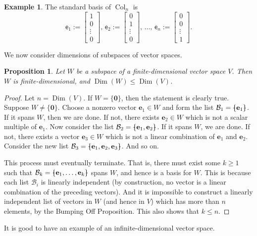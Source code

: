 \documentclass[a4paper,11pt]{book}
\newtheorem{proposition}[theorem]{Proposition}
\theoremstyle{definition}
\newtheorem{example_environment}{Example}[chapter]
\newcommand{\ve}[1]{\mathbf{#1}}
\newcommand{\mat}[1]{\mathsf{#1}}
\newcommand{\col}[1]{\bm{\mat{#1}}}
\newcommand{\basis}[1]{{\mathcal #1}}
\newenvironment{example}
	{
		\begin{oframed} 
		\begin{example_environment}
	}
	{
		\end{example_environment}
		\end{oframed}
	}
\newcommand{\bmark}{\raisebox{.53ex}{\rule{.2em}{.1ex}}}
\newcommand{\bopen}{{\protect\ooalign{\{\cr\hfil\bmark\hfil\cr}}}
\newcommand{\bclose}{{\protect\ooalign{\}\cr\hfil\bmark\hfil\cr}}}
\DeclareMathOperator{\Col}{Col}
\DeclareMathOperator{\Dim}{Dim}
\begin{document}
\begin{example} The standard basis of $\Col_n$ is  
\[
 \col{e}_1 := \left[ \begin{array}{c} 1 \\ 0 \\ \vdots \\ 0 \end{array} \right], \, 
\col{e}_2 := \left[ \begin{array}{c} 0 \\ 1 \\ \vdots \\ 0 \end{array} \right], \, 
\ldots, \,
\col{e}_n := \left[ \begin{array}{c} 0 \\ 0 \\ \vdots \\ 1 \end{array} \right] . 
\]
\end{example}
We now consider dimensions of subspaces of vector spaces. 
\begin{proposition} Let $W$ be a subspace of a finite-dimensional vector space $V$. Then $W$ is finite-dimensional, and $\Dim(W) \leq \Dim(V)$.  \label{dim-of-subspace-prop}
\end{proposition}
\begin{proof} Let $n = \Dim(V)$. If $W = \{ \ve{0} \}$, then the statement is clearly true. Suppose $W \neq \{ \ve{0} \}$. Choose a nonzero vector $\ve{e}_1 \in W$ and form the list $\basis{B}_1 = \bopen \ve{e}_1 \bclose$. If it spans $W$, then we are done. If not, there exists $\ve{e}_2 \in W$ which is not a scalar multiple of $\ve{e}_1$. Now consider the list $\basis{B}_2 = \bopen \ve{e}_1, \ve{e}_2 \bclose$. If it spans $W$, we are done. If not, there exists a vector $\ve{e}_3 \in W$ which is not a linear combination of $\ve{e}_1$ and $\ve{e}_2$. Consider the new list $\basis{B}_3 = \bopen \ve{e}_1, \ve{e}_2, \ve{e}_3 \bclose$. And so on.

This process must eventually terminate. That is, there must exist some $k \geq 1$ such that $\basis{B}_k = \bopen \ve{e}_1, \ldots, \ve{e}_k \bclose$ spans $W$, and hence is a basis for $W$. This is because each list $\basis{B}_i$ is linearly independent (by construction, no vector is a linear combination of the preceding vectors). And it is impossible to construct a linearly independent list of vectors in $W$ (and hence in $V$) which has more than $n$ elements, by the Bumping Off Proposition. This also shows that $k \leq n$. 

\end{proof}
It is good to have an example of an infinite-dimensional vector space.
\end{document}
